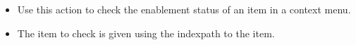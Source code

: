 
\begin{itemize}
\item Use this action to check the enablement status of an item in a context menu.
\item The item to check is given using the indexpath to the item.
\end{itemize}

